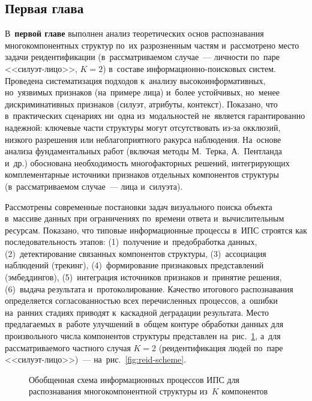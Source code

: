 \subsection*{Первая глава}

В~\textbf{первой главе} выполнен анализ теоретических основ распознавания
многокомпонентных структур по~их разрозненным частям и~рассмотрено место
задачи реидентификации (в~рассматриваемом случае~--- личности по~паре
<<силуэт-лицо>>, $K=2$) в~составе информационно-поисковых систем. Проведена
систематизация подходов к~анализу высокоинформативных, но~уязвимых
признаков (на~примере лица) и~более устойчивых, но~менее дискриминативных
признаков (силуэт, атрибуты, контекст). Показано, что в~практических
сценариях ни~одна из~модальностей не~является гарантированно надежной:
ключевые части структуры могут отсутствовать из-за окклюзий, низкого
разрешения или неблагоприятного ракурса наблюдения. На~основе анализа
фундаментальных работ (включая методы М.~Терка, А.~Пентланда и~др.)
обоснована необходимость многофакторных решений, интегрирующих
комплементарные источники признаков отдельных компонентов структуры
(в~рассматриваемом случае~--- лица и~силуэта).

Рассмотрены современные постановки задач визуального поиска объекта
в~массиве данных при ограничениях по~времени ответа и~вычислительным
ресурсам. Показано, что типовые информационные процессы в~ИПС строятся
как последовательность этапов: (1)~получение и~предобработка данных,
(2)~детектирование связанных компонентов структуры, (3)~ассоциация
наблюдений (трекинг), (4)~формирование признаковых представлений
(эмбеддингов), (5)~интеграция источников признаков и~принятие решения,
(6)~выдача результата и~протоколирование. Качество итогового распознавания
определяется согласованностью всех перечисленных процессов, а~ошибки
на~ранних стадиях приводят к~каскадной деградации результата. Место
предлагаемых в~работе улучшений в~общем контуре обработки данных
для произвольного числа компонентов структуры представлен
на~рис.~\ref{fig:ipc-generic}, а~для рассматриваемого частного
случая $K=2$ (реидентификация людей по~паре <<силуэт-лицо>>)~---
на~рис.~\ref{fig:reid-scheme}.

\begin{figure}[H]
\centering
\resizebox{\textwidth}{!}{}
\caption{Обобщенная схема информационных процессов ИПС
для распознавания многокомпонентной структуры из~$K$ компонентов}
\label{fig:ipc-generic}
\end{figure}

